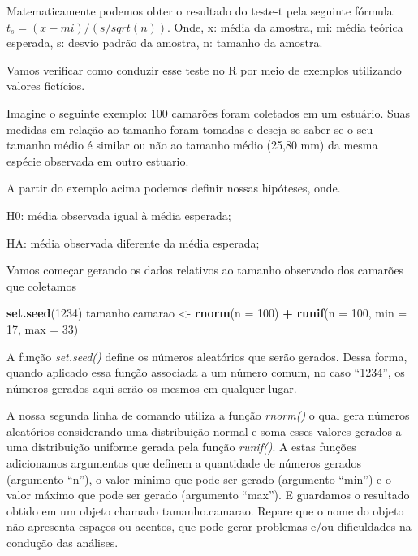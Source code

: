 \documentclass[titlepage, oneside, openany, a4paper]{book}
\newenvironment{Shaded}{\begin{snugshade}}{\end{snugshade}}
\newcommand{\DataTypeTok}[1]{\textcolor[rgb]{0.13,0.29,0.53}{#1}}
\newcommand{\DecValTok}[1]{\textcolor[rgb]{0.00,0.00,0.81}{#1}}
\newcommand{\KeywordTok}[1]{\textcolor[rgb]{0.13,0.29,0.53}{\textbf{#1}}}
\newcommand{\NormalTok}[1]{#1}
\newcommand{\OperatorTok}[1]{\textcolor[rgb]{0.81,0.36,0.00}{\textbf{#1}}}
\newcommand{\StringTok}[1]{\textcolor[rgb]{0.31,0.60,0.02}{#1}}
\begin{document}
Matematicamente podemos obter o resultado do teste-t pela seguinte fórmula: \(t_s=(x-mi)/(s/sqrt(n))\). Onde, x: média da amostra, mi: média teórica esperada, s: desvio padrão da amostra, n: tamanho da amostra.

Vamos verificar como conduzir esse teste no R por meio de exemplos utilizando valores fictícios.

Imagine o seguinte exemplo: 100 camarões foram coletados em um estuário. Suas medidas em relação ao tamanho foram tomadas e deseja-se saber se o seu tamanho médio é similar ou não ao tamanho médio (25,80 mm) da mesma espécie observada em outro estuario.

A partir do exemplo acima podemos definir nossas hipóteses, onde.

H0: média observada igual à média esperada;

HA: média observada diferente da média esperada;

Vamos começar gerando os dados relativos ao tamanho observado dos camarões que coletamos

\begin{Shaded}
\begin{Highlighting}[]
\KeywordTok{set.seed}\NormalTok{(}\DecValTok{1234}\NormalTok{)}
\NormalTok{tamanho.camarao <-}\StringTok{ }\KeywordTok{rnorm}\NormalTok{(}\DataTypeTok{n =} \DecValTok{100}\NormalTok{) }\OperatorTok{+}\StringTok{ }\KeywordTok{runif}\NormalTok{(}\DataTypeTok{n =} \DecValTok{100}\NormalTok{, }\DataTypeTok{min =} \DecValTok{17}\NormalTok{, }\DataTypeTok{max =} \DecValTok{33}\NormalTok{)}
\end{Highlighting}
\end{Shaded}

A função \emph{set.seed()} define os números aleatórios que serão gerados. Dessa forma, quando aplicado essa função associada a um número comum, no caso ``1234'', os números gerados aqui serão os mesmos em qualquer lugar.

A nossa segunda linha de comando utiliza a função \emph{rnorm()} o qual gera números aleatórios considerando uma distribuição normal e soma esses valores gerados a uma distribuição uniforme gerada pela função \emph{runif()}. A estas funções adicionamos argumentos que definem a quantidade de números gerados (argumento ``n''), o valor mínimo que pode ser gerado (argumento ``min'') e o valor máximo que pode ser gerado (argumento ``max''). E guardamos o resultado obtido em um objeto chamado tamanho.camarao. Repare que o nome do objeto não apresenta espaços ou acentos, que pode gerar problemas e/ou dificuldades na condução das análises.
\end{document}
